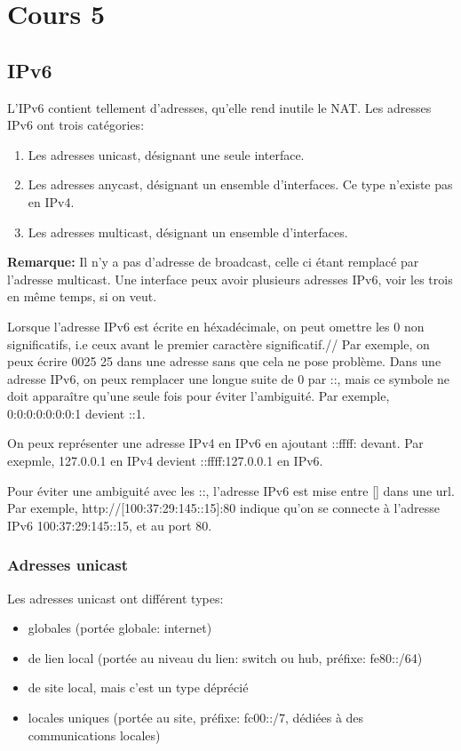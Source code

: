 \section{Cours 5}
\subsection{IPv6}
L'IPv6 contient tellement d'adresses, qu'elle rend inutile le NAT.
Les adresses IPv6 ont trois catégories:
\begin{enumerate}
	\item Les adresses unicast, désignant une seule interface.
	\item Les adresses anycast, désignant un ensemble d'interfaces. Ce type n'existe pas en IPv4.
	\item Les adresses multicast, désignant un ensemble d'interfaces.
\end{enumerate}
\textbf{Remarque:} Il n'y a pas d'adresse de broadcast, celle ci étant remplacé par l'adresse multicast.
Une interface peux avoir plusieurs adresses IPv6, voir les trois en même temps, si on veut.

Lorsque l'adresse IPv6 est écrite en héxadécimale, on peut omettre les 0 non significatifs,
i.e ceux avant le premier caractère significatif.//
Par exemple, on peux écrire 0025 25 dans une adresse sans que cela ne pose problème.
Dans une adresse IPv6, on peux remplacer une longue suite de 0 par ::, mais ce symbole ne doit apparaître
qu'une seule fois pour éviter l'ambiguité. Par exemple, 0:0:0:0:0:0:0:1 devient ::1.

On peux représenter une adresse IPv4 en IPv6 en ajoutant ::ffff: devant.
Par exepmle, 127.0.0.1 en IPv4 devient ::ffff:127.0.0.1 en IPv6.

Pour éviter une ambiguité avec les ::, l'adresse IPv6 est mise entre [] dans une url.
Par exemple, http://[100:37:29:145::15]:80 indique qu'on se connecte à l'adresse IPv6 100:37:29:145::15, et au port 80.

\subsubsection{Adresses unicast}
Les adresses unicast ont différent types:
\begin{itemize}
	\item globales (portée globale: internet)
	\item de lien local (portée au niveau du lien: switch ou hub, préfixe: fe80::/64)
	\item de site local, mais c'est un type déprécié
	\item locales uniques (portée au site, préfixe: fc00::/7, dédiées à des communications locales)
\end{itemize}

